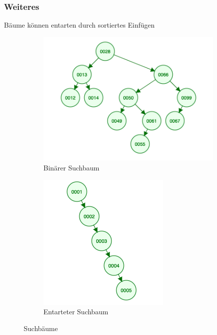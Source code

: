 \documentclass{article}
\begin{document}
	\subsubsection*{Weiteres}
	Bäume können entarten durch sortiertes Einfügen
	\begin{figure}[H]
		\centering
		\begin{subfigure}{.5\textwidth}
			\centering
			\includegraphics[width=1.2\linewidth]{Abbildungen/suchbaum}
			\caption{Binärer Suchbaum}
			\label{fig:suchbaum}
		\end{subfigure}%
		\begin{subfigure}{.5\textwidth}
			\centering
			\includegraphics[width=0.7\linewidth]{Abbildungen/entartet}
			\caption{Entarteter Suchbaum}
			\label{fig:entartet}
		\end{subfigure}%
	\caption{Suchbäume}
	\end{figure}
	
\end{document}
